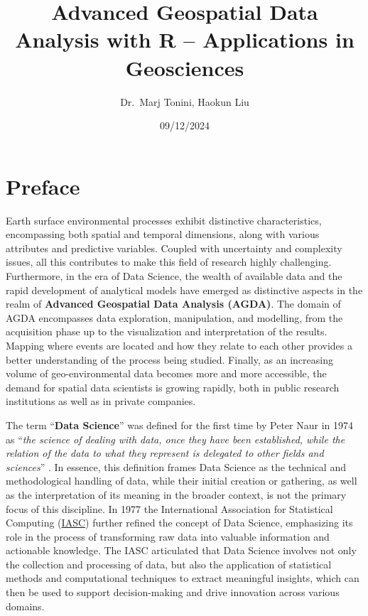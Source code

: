 \documentclass[
]{article}
\title{Advanced Geospatial Data Analysis with R -- Applications in Geosciences}
\author{Dr.~Marj Tonini, Haokun Liu}
\date{09/12/2024}
\begin{document}
\maketitle

{
\setcounter{tocdepth}{2}
\tableofcontents
}
\section*{Preface}\label{preface}

Earth surface environmental processes exhibit distinctive characteristics, encompassing both spatial and temporal dimensions, along with various attributes and predictive variables.
Coupled with uncertainty and complexity issues, all this contributes to make this field of research highly challenging.
Furthermore, in the era of Data Science, the wealth of available data and the rapid development of analytical models have emerged as distinctive aspects in the realm of \textbf{Advanced Geospatial Data Analysis (AGDA)}.
The domain of AGDA encompasses data exploration, manipulation, and modelling, from the acquisition phase up to the visualization and interpretation of the results.
Mapping where events are located and how they relate to each other provides a better understanding of the process being studied.
Finally, as an increasing volume of geo-environmental data becomes more and more accessible, the demand for spatial data scientists is growing rapidly, both in public research institutions as well as in private companies.

The term ``\textbf{Data Science}'' was defined for the first time by Peter Naur in 1974 as ``\emph{the science of dealing with data, once they have been established, while the relation of the data to what they represent is delegated to other fields and sciences}'' \citep{naur_peter_concise_1974}.
In essence, this definition frames Data Science as the technical and methodological handling of data, while their initial creation or gathering, as well as the interpretation of its meaning in the broader context, is not the primary focus of this discipline.
In 1977 the International Association for Statistical Computing (\href{https://iasc-isi.org/}{IASC}) further refined the concept of Data Science, emphasizing its role in the process of transforming raw data into valuable information and actionable knowledge.
The IASC articulated that Data Science involves not only the collection and processing of data, but also the application of statistical methods and computational techniques to extract meaningful insights, which can then be used to support decision-making and drive innovation across various domains.
\end{document}
